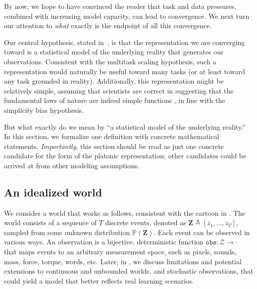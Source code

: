 \documentclass{article}
\newcommand{\jh}[1]{{\;\color{red}JH: #1}}
\newcommand{\hypbox}[2]{%
\begin{tcolorbox}[colback=white!98!black,colframe=white!30!black,boxsep=1.1pt,top=6.75pt]%
\vspace{1.75pt}%
\textbf{#1}\\[-0.575em]
\noindent\makebox[\textwidth]{\rule{\textwidth}{0.4pt}}
\\[0.25em]
#2
\end{tcolorbox}
}
\theoremstyle{plain}
\theoremstyle{definition}
\theoremstyle{remark}
\begin{document}

By now, we hope to have convinced the reader that task and data pressures, combined with increasing model capacity, can lead to convergence. We next turn our attention to \textit{what} exactly is the endpoint of all this convergence. 

Our central hypothesis, stated in~, is that the representation we are converging toward is a statistical model of the underlying reality that generates our observations. Consistent with the multitask scaling hypothesis, such a representation would naturally be useful toward many tasks (or at least toward any task grounded in reality). Additionally, this representation might be relatively simple, assuming that scientists
are correct in suggesting that the fundamental laws of nature are indeed simple functions \citep{gell1995quark}, in line with the simplicity bias hypothesis.

But what exactly do we mean by ``a statistical model of the underlying reality.'' In this section, we formalize one definition with concrete mathematical statements. \emph{Importantly}, this section should be read as just one concrete candidate for the form of the platonic representation; other candidates could be arrived at from other modeling assumptions. %



\subsection{An idealized world}
We consider a world that works as follows, consistent with the cartoon in . The world consists of a sequence of $T$ discrete events, denoted as $\mathbf{Z} \triangleq [z_1, \ldots, z_T]$, sampled from some unknown distribution $\mathbb{P}(\mathbf{Z})$. Each event can be observed in various ways. An observation is a bijective, deterministic function $\texttt{obs}: \mathcal{Z} \rightarrow \cdot{}\,$ that maps events to an arbitrary measurement space, such as pixels, sounds, mass, force, torque, words, etc. 
Later, in , we discuss limitations and potential extensions to continuous and unbounded worlds, and stochastic observations, that could yield a model that better reflects real learning scenarios.
\end{document}
